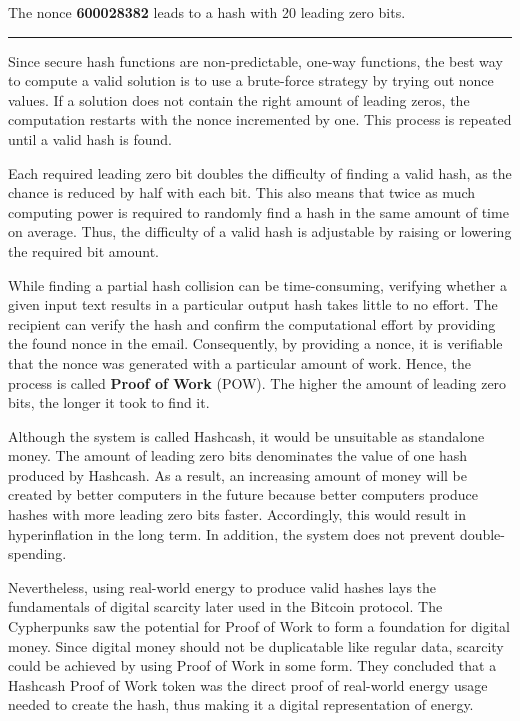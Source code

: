 The nonce \textbf{600028382} leads to a hash with 20 leading zero bits.
\hrule
\vspace{4pt}

Since secure hash functions are non-predictable, one-way functions, the best way to compute a valid solution is to use a brute-force strategy by trying out nonce values.
If a solution does not contain the right amount of leading zeros, the computation restarts with the nonce incremented by one.
This process is repeated until a valid hash is found.

Each required leading zero bit doubles the difficulty of finding a valid hash, as the chance is reduced by half with each bit.
This also means that twice as much computing power is required to randomly find a hash in the same amount of time on average.
Thus, the difficulty of a valid hash is adjustable by raising or lowering the required bit amount.

While finding a partial hash collision can be time-consuming, verifying whether a given input text results in a particular output hash takes little to no effort.
The recipient can verify the hash and confirm the computational effort by providing the found nonce in the email. \cite{back1997}
Consequently, by providing a nonce, it is verifiable that the nonce was generated with a particular amount of work.
Hence, the process is called \textbf{Proof of Work} (POW).
The higher the amount of leading zero bits, the longer it took to find it.

Although the system is called Hashcash, it would be unsuitable as standalone money.
The amount of leading zero bits denominates the value of one hash produced by Hashcash.
As a result, an increasing amount of money will be created by better computers in the future because better computers produce hashes with more leading zero bits faster.
Accordingly, this would result in hyperinflation in the long term. 
In addition, the system does not prevent double-spending.

Nevertheless, using real-world energy to produce valid hashes lays the fundamentals of digital scarcity later used in the Bitcoin protocol. \cite{wirdum_2_2018}
The Cypherpunks saw the potential for Proof of Work to form a foundation for digital money.
Since digital money should not be duplicatable like regular data, scarcity could be achieved by using Proof of Work in some form.
They concluded that a Hashcash Proof of Work token was the direct proof of real-world energy usage needed to create the hash, thus making it a digital representation of energy. \cite{wirdum_5_2018}

